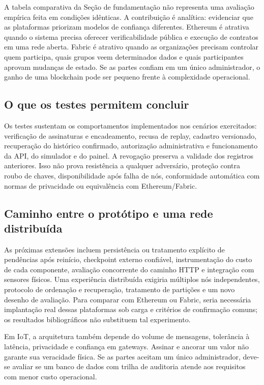\documentclass[10pt,a4paper,twocolumn]{article}
\begin{document}
A tabela comparativa da Seção de fundamentação não representa uma avaliação empírica feita em condições idênticas. A contribuição é analítica: evidenciar que as plataformas priorizam modelos de confiança diferentes. Ethereum é atrativa quando o sistema precisa oferecer verificabilidade pública e execução de contratos em uma rede aberta. Fabric é atrativo quando as organizações precisam controlar quem participa, quais grupos veem determinados dados e quais participantes aprovam mudanças de estado. Se as partes confiam em um único administrador, o ganho de uma blockchain pode ser pequeno frente à complexidade operacional.

\subsection{O que os testes permitem concluir}
Os testes sustentam os comportamentos implementados nos cenários exercitados: verificação de assinaturas e encadeamento, recusa de replay, cadastro versionado, recuperação do histórico confirmado, autorização administrativa e funcionamento da API, do simulador e do painel. A revogação preserva a validade dos registros anteriores. Isso não prova resistência a qualquer adversário, proteção contra roubo de chaves, disponibilidade após falha de nós, conformidade automática com normas de privacidade ou equivalência com Ethereum/Fabric.

\subsection{Caminho entre o protótipo e uma rede distribuída}
As próximas extensões incluem persistência ou tratamento explícito de pendências após reinício, checkpoint externo confiável, instrumentação do custo de cada componente, avaliação concorrente do caminho HTTP e integração com sensores físicos. Uma experiência distribuída exigiria múltiplos nós independentes, protocolo de ordenação e recuperação, tratamento de partições e um novo desenho de avaliação. Para comparar com Ethereum ou Fabric, seria necessária implantação real dessas plataformas sob carga e critérios de confirmação comuns; os resultados bibliográficos não substituem tal experimento.

Em IoT, a arquitetura também depende do volume de mensagens, tolerância à latência, privacidade e confiança em gateways. Assinar e ancorar um valor não garante sua veracidade física. Se as partes aceitam um único administrador, deve-se avaliar se um banco de dados com trilha de auditoria atende aos requisitos com menor custo operacional.
\end{document}
